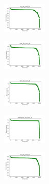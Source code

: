 \vspace*{\fill}
\newpage
\vspace*{\fill}

\begin{figure}[H]
    \centering
    \begin{subfigure}
        \centering
        \includegraphics[width=0.234\textwidth]{img/HS-LS-v2/iris_set_const_20_949004259_cost.png}
    \end{subfigure}
    \hfill
    \begin{subfigure}
        \centering
        \includegraphics[width=0.234\textwidth]{img/HS-LS-v2/ecoli_set_const_20_949004259_cost.png}
    \end{subfigure}
    \hfill
    \begin{subfigure}
        \centering
        \includegraphics[width=0.234\textwidth]{img/HS-LS-v2/rand_set_const_20_949004259_cost.png}
    \end{subfigure}
    \hfill
    \begin{subfigure}
        \centering
        \includegraphics[width=0.234\textwidth]{img/HS-LS-v2/newthyroid_set_const_20_949004259_cost.png}
    \end{subfigure}
    \hfill
    \begin{subfigure}
        \centering
        \includegraphics[width=0.234\textwidth]{img/HS-LS-v2/iris_set_const_20_589741062_cost.png}

\end{subfigure}
\end{figure}
